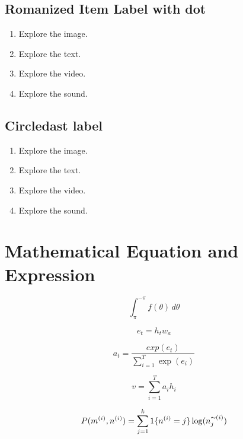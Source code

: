 \documentclass[11pt]{article}
\begin{document}
\subsection{Romanized Item Label with dot}
\begin{enumerate}[nosep, label=\Roman*.]
\item Explore the image.
\item Explore the text.
\item Explore the video.
\item Explore the sound.
\end{enumerate}

\subsection{Circledast label}
\begin{enumerate}[label=$\circledast$]
\item Explore the image.
\item Explore the text.
\item Explore the video.
\item Explore the sound.
\end{enumerate}

\section{Mathematical Equation and Expression}
\label{ref:equation}
\begin{equation}
\int_{\pi}^{-\pi} f(\theta) \, d\theta
\end{equation}

\begin{equation}
e_{t} = h_{t}w_{a}
\label{eqn:sampleEqn} %
\end{equation}

\begin{equation*} %
a_{t} = \frac{exp(e_{t})}{\sum^T_{i=1}\exp(e_{i})}
\end{equation*}

\begin{equation*}
v = \sum^T_{i=1} a_{i} h_{i}
\end{equation*}

\begin{equation*}
P(m^{(i)},n^{(i)}) = \sum^k_{j=1} 1\{n^{(i)}=j\} \log(n_j^{\thicksim(i)}) %
\end{equation*}
\end{document}
